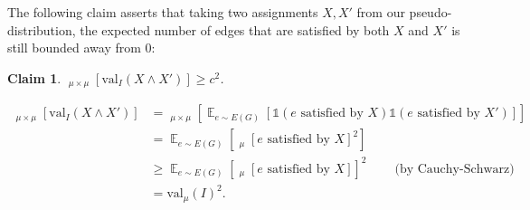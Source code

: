 \documentclass[11pt]{article}
\DeclareMathOperator*{\E}{\mathbb{E}}
\DeclareMathOperator*{\pE}{\widetilde{\mathbb{E}}}
\DeclareMathOperator*{\pPr}{\widetilde{\Pr}}
\def \one {\mathbb{1}}
\def \val {\mathrm{val}}
\newcommand{\mitali}[1]{}
\newtheorem{claim}[theorem]{Claim}
\theoremstyle{definition}
\begin{document}
The following claim asserts that taking two assignments $X, X'$ from our pseudo-distribution, 
the expected number of edges that are satisfied by 
both $X$ and $X'$ is still bounded away from $0$:
\begin{claim}\label{claim:val-intersection-restated}
$\pE_{\mu \times \mu}[\val_I(X \wedge X')] \geq c^2$.
\end{claim}
\begin{align*}
\pE_{\mu \times \mu}[\val_I(X \wedge X')] &= \pE_{\mu \times \mu}[\E_{e \sim E(G)}[\one(e \text{ satisfied by } X)\one(e \text{ satisfied by } X')]] \\
&= \E_{e \sim E(G)}[\pPr_\mu[e \text{ satisfied by } X]^2] \\
&\geq \E_{e \sim E(G)}[\pPr_\mu[e \text{ satisfied by } X]]^2 ~~~~~~~~~~\text{(by Cauchy-Schwarz)}\\
&= \val_\mu(I)^2.
\end{align*}




\end{document}
